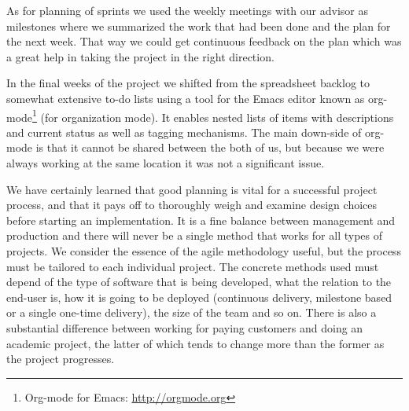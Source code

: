 As for planning of sprints we used the weekly meetings with our advisor as
milestones where we summarized the work that had been done and the plan for the
next week. That way we could get continuous feedback on the plan which was a
great help in taking the project in the right direction.

In the final weeks of the project we shifted from the spreadsheet backlog to
somewhat extensive to-do lists using a tool for the Emacs editor known as
org-mode\footnote{Org-mode for Emacs: \url{http://orgmode.org}} (for
organization mode). It enables nested lists of items with descriptions and
current status as well as tagging mechanisms. The main down-side of org-mode is
that it cannot be shared between the both of us, but because we were always
working at the same location it was not a significant issue.

We have certainly learned that good planning is vital for a successful project
process, and that it pays off to thoroughly weigh and examine design choices
before starting an implementation. It is a fine balance between management and
production and there will never be a single method that works for all types of
projects. We consider the essence of the agile methodology useful, but the
process must be tailored to each individual project. The concrete methods used
must depend of the type of software that is being developed, what the relation
to the end-user is, how it is going to be deployed (continuous delivery,
milestone based or a single one-time delivery), the size of the team and so
on. There is also a substantial difference between working for paying customers
and doing an academic project, the latter of which tends to change more than the
former as the project progresses.

